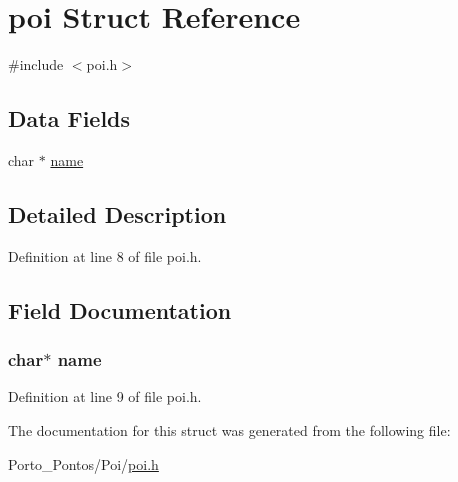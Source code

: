\hypertarget{structpoi}{}\section{poi Struct Reference}
\label{structpoi}


{\ttfamily \#include $<$poi.\+h$>$}

\subsection*{Data Fields}
\begin{DoxyCompactItemize}
\item 
char $\ast$ \hyperlink{structpoi_a5ac083a645d964373f022d03df4849c8}{name}
\end{DoxyCompactItemize}


\subsection{Detailed Description}


Definition at line 8 of file poi.\+h.



\subsection{Field Documentation}
\hypertarget{structpoi_a5ac083a645d964373f022d03df4849c8}{}
\subsubsection[{name}]{\setlength{\rightskip}{0pt plus 5cm}char$\ast$ name}\label{structpoi_a5ac083a645d964373f022d03df4849c8}


Definition at line 9 of file poi.\+h.



The documentation for this struct was generated from the following file\+:\begin{DoxyCompactItemize}
\item 
Porto\+\_\+\+Pontos/\+Poi/\hyperlink{poi_8h}{poi.\+h}\end{DoxyCompactItemize}
